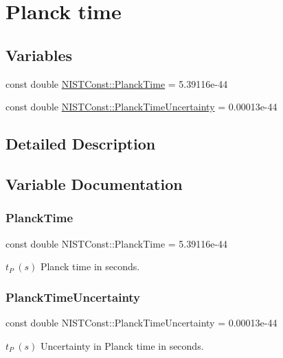 \hypertarget{group___planck_time}{}\section{Planck time}
\label{group___planck_time}
\subsection*{Variables}
\begin{DoxyCompactItemize}
\item 
const double \hyperlink{group___planck_time_gac9e14a0a1b63ee5342e81d860131b036}{N\+I\+S\+T\+Const\+::\+Planck\+Time} = 5.\+39116e-\/44
\item 
const double \hyperlink{group___planck_time_ga05e9961b507af78ada2a1efbc350fc08}{N\+I\+S\+T\+Const\+::\+Planck\+Time\+Uncertainty} = 0.\+00013e-\/44
\end{DoxyCompactItemize}


\subsection{Detailed Description}


\subsection{Variable Documentation}
\mbox{\label{group___planck_time_gac9e14a0a1b63ee5342e81d860131b036}} 
\subsubsection{\texorpdfstring{Planck\+Time}{PlanckTime}}
{\footnotesize\ttfamily const double N\+I\+S\+T\+Const\+::\+Planck\+Time = 5.\+39116e-\/44}

$t_P \ (s)$ Planck time in seconds. \mbox{\label{group___planck_time_ga05e9961b507af78ada2a1efbc350fc08}} 
\subsubsection{\texorpdfstring{Planck\+Time\+Uncertainty}{PlanckTimeUncertainty}}
{\footnotesize\ttfamily const double N\+I\+S\+T\+Const\+::\+Planck\+Time\+Uncertainty = 0.\+00013e-\/44}

$t_P \ (s)$ Uncertainty in Planck time in seconds. 